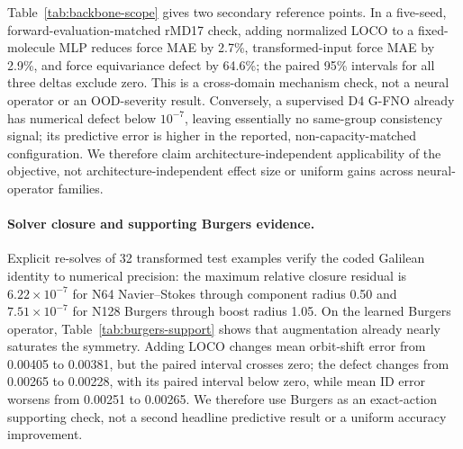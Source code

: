Table~\ref{tab:backbone-scope} gives two secondary reference points.  In a
five-seed, forward-evaluation-matched rMD17 check, adding normalized LOCO to a
fixed-molecule MLP reduces force MAE by 2.7\%, transformed-input force MAE by
2.9\%, and force equivariance defect by 64.6\%; the paired 95\% intervals for all
three deltas exclude zero.  This is a cross-domain mechanism check, not a neural
operator or an OOD-severity result.  Conversely, a supervised D4 G-FNO already
has numerical defect below \(10^{-7}\), leaving essentially no same-group
consistency signal; its predictive error is higher in the reported,
non-capacity-matched configuration.  We therefore claim architecture-independent
applicability of the objective, not architecture-independent effect size or
uniform gains across neural-operator families.

\paragraph{Solver closure and supporting Burgers evidence.}
Explicit re-solves of 32 transformed test examples verify the coded Galilean
identity to numerical precision: the maximum relative closure residual is
\(6.22\times10^{-7}\) for N64 Navier--Stokes through component radius 0.50 and
\(7.51\times10^{-7}\) for N128 Burgers through boost radius 1.05.  On the learned
Burgers operator, Table~\ref{tab:burgers-support} shows that augmentation already
nearly saturates the symmetry.  Adding LOCO changes mean orbit-shift error from
0.00405 to 0.00381, but the paired interval crosses zero; the defect changes from
0.00265 to 0.00228, with its paired interval below zero, while mean ID error
worsens from 0.00251 to 0.00265.  We therefore use Burgers as an exact-action
supporting check, not a second headline predictive result or a uniform accuracy
improvement.

